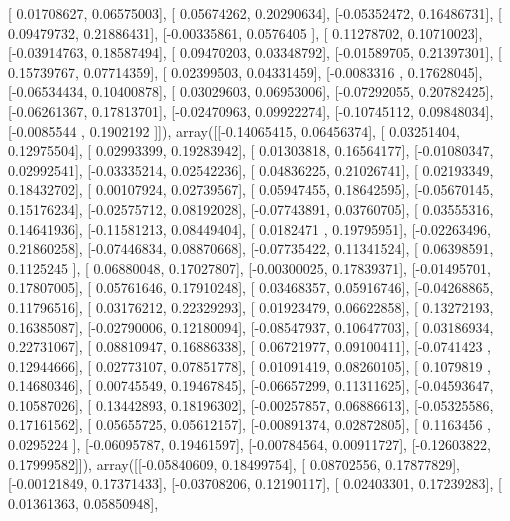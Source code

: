 \documentclass{article}
\begin{document}
       [ 0.01708627,  0.06575003],
       [ 0.05674262,  0.20290634],
       [-0.05352472,  0.16486731],
       [ 0.09479732,  0.21886431],
       [-0.00335861,  0.0576405 ],
       [ 0.11278702,  0.10710023],
       [-0.03914763,  0.18587494],
       [ 0.09470203,  0.03348792],
       [-0.01589705,  0.21397301],
       [ 0.15739767,  0.07714359],
       [ 0.02399503,  0.04331459],
       [-0.0083316 ,  0.17628045],
       [-0.06534434,  0.10400878],
       [ 0.03029603,  0.06953006],
       [-0.07292055,  0.20782425],
       [-0.06261367,  0.17813701],
       [-0.02470963,  0.09922274],
       [-0.10745112,  0.09848034],
       [-0.0085544 ,  0.1902192 ]]), array([[-0.14065415,  0.06456374],
       [ 0.03251404,  0.12975504],
       [ 0.02993399,  0.19283942],
       [ 0.01303818,  0.16564177],
       [-0.01080347,  0.02992541],
       [-0.03335214,  0.02542236],
       [ 0.04836225,  0.21026741],
       [ 0.02193349,  0.18432702],
       [ 0.00107924,  0.02739567],
       [ 0.05947455,  0.18642595],
       [-0.05670145,  0.15176234],
       [-0.02575712,  0.08192028],
       [-0.07743891,  0.03760705],
       [ 0.03555316,  0.14641936],
       [-0.11581213,  0.08449404],
       [ 0.0182471 ,  0.19795951],
       [-0.02263496,  0.21860258],
       [-0.07446834,  0.08870668],
       [-0.07735422,  0.11341524],
       [ 0.06398591,  0.1125245 ],
       [ 0.06880048,  0.17027807],
       [-0.00300025,  0.17839371],
       [-0.01495701,  0.17807005],
       [ 0.05761646,  0.17910248],
       [ 0.03468357,  0.05916746],
       [-0.04268865,  0.11796516],
       [ 0.03176212,  0.22329293],
       [ 0.01923479,  0.06622858],
       [ 0.13272193,  0.16385087],
       [-0.02790006,  0.12180094],
       [-0.08547937,  0.10647703],
       [ 0.03186934,  0.22731067],
       [ 0.08810947,  0.16886338],
       [ 0.06721977,  0.09100411],
       [-0.0741423 ,  0.12944666],
       [ 0.02773107,  0.07851778],
       [ 0.01091419,  0.08260105],
       [ 0.1079819 ,  0.14680346],
       [ 0.00745549,  0.19467845],
       [-0.06657299,  0.11311625],
       [-0.04593647,  0.10587026],
       [ 0.13442893,  0.18196302],
       [-0.00257857,  0.06886613],
       [-0.05325586,  0.17161562],
       [ 0.05655725,  0.05612157],
       [-0.00891374,  0.02872805],
       [ 0.1163456 ,  0.0295224 ],
       [-0.06095787,  0.19461597],
       [-0.00784564,  0.00911727],
       [-0.12603822,  0.17999582]]), array([[-0.05840609,  0.18499754],
       [ 0.08702556,  0.17877829],
       [-0.00121849,  0.17371433],
       [-0.03708206,  0.12190117],
       [ 0.02403301,  0.17239283],
       [ 0.01361363,  0.05850948],
\end{document}
